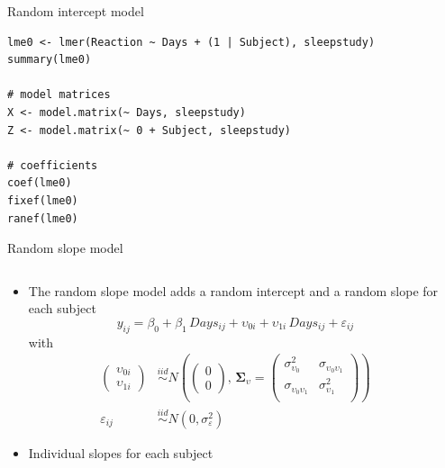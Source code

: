 \documentclass[aspectratio=169]{beamer}
\newcommand{\gmat}[1]{\boldsymbol{#1}}
\begin{document}
\begin{frame}[fragile]{Random intercept model}
\begin{lstlisting}
lme0 <- lmer(Reaction ~ Days + (1 | Subject), sleepstudy)
summary(lme0)

# model matrices
X <- model.matrix(~ Days, sleepstudy)
Z <- model.matrix(~ 0 + Subject, sleepstudy)

# coefficients
coef(lme0)
fixef(lme0)
ranef(lme0)
\end{lstlisting}
\end{frame}

\begin{frame}[fragile]{Random slope model}
  \begin{columns}
    \begin{column}{.5\textwidth}
  \begin{itemize}
\item The random slope model adds a random intercept and a random slope for each
  subject
\[
  y_{ij} = \beta_0 + \beta_1\,Days_{ij} + \upsilon_{0i} +
      \upsilon_{1i}\,Days_{ij} + \varepsilon_{ij}
\]
with
\begin{align*}
  \begin{pmatrix} \upsilon_{0i}\\ \upsilon_{1i} \end{pmatrix} &\overset{iid}{\sim}
    N \left(\begin{pmatrix} 0\\ 0 \end{pmatrix}, \, \gmat{\Sigma}_\upsilon =
      \begin{pmatrix}
        \sigma^2_{\upsilon_0} & \sigma_{\upsilon_0 \upsilon_1} \\
        \sigma_{\upsilon_0 \upsilon_1} & \sigma^2_{\upsilon_1} \\
      \end{pmatrix} \right)
    \\
  \varepsilon_{ij} & \overset{iid}{\sim} N(0, \sigma_{\varepsilon}^2)
\end{align*}
      \vspace{-.5cm}
    \item Individual slopes for each subject
  \end{itemize}
    \end{column}
    \begin{column}{.5\textwidth}

\end{column}
\end{columns}
\end{frame}
\end{document}
